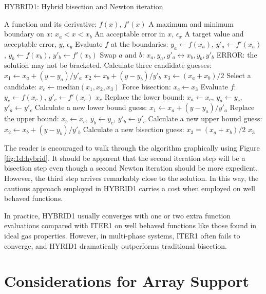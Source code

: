\documentclass{article}
\begin{document}
\begin{algorithm}
\caption{HYBRID1: Hybrid bisection and Newton iteration}\label{alg:hybrid1}
\begin{algorithmic}
\REQUIRE A function and its derivative: $f(x)$, $f'(x)$
\REQUIRE A maximum and minimum boundary on $x$: $x_a < x <x_b$
\REQUIRE An acceptable error in $x$, $\epsilon_x$
\REQUIRE A target value and acceptable error, $y$, $\epsilon_y$
\STATE Evaluate $f$ at the boundaries: 
\STATE $y_a \leftarrow f(x_a)$, $y'_a \leftarrow f'(x_a)$, $y_b \leftarrow f(x_b)$, $y'_b \leftarrow f'(x_b)$
\STATE Swap $a$ and $b$: 
\STATE $x_a,y_a,y'_a \leftrightarrow x_b,y_b,y'_b$
\ENDIF
{}
\RETURN ERROR: the solution may not be bracketed.
\ENDIF
\STATE Calculate three candidate guesses:
\STATE $x_1 \leftarrow x_a + (y-y_a)/y'_a$
\STATE $x_2 \leftarrow x_b + (y-y_b)/y'_b$
\STATE $x_3 \leftarrow (x_a + x_b)/2$
\STATE Select a candidate: 
\STATE $x_c \leftarrow \mathrm{median}(x_1,x_2,x_3)$
\STATE Force bisection: 
\STATE $x_c \leftarrow x_3$
\ENDIF
\STATE Evaluate $f$: 
\STATE $y_c \leftarrow f(x_c)$, $y'_c\leftarrow f'(x_c)$
\RETURN $x_c$
\ENDIF
{}
\STATE Replace the lower bound: 
\STATE $x_a \leftarrow x_c$, $y_a \leftarrow y_c$, $y'_a \leftarrow y'_c$
\STATE Calculate a new lower bound guess:
\STATE $x_1 \leftarrow x_a + (y - y_a)/y'_a$
\ELSE
\STATE Replace the upper bound:
\STATE $x_b \leftarrow x_c$, $y_b \leftarrow y_c$, $y'_b \leftarrow y'_c$
\STATE Calculate a new upper bound guess:
\STATE $x_2 \leftarrow x_b + (y - y_b)/y'_b$
\ENDIF
\STATE Calculate a new bisection guess:
\STATE $x_3 = (x_a + x_b)/2$
\RETURN $x_3$
\ENDWHILE

\end{algorithmic}
\end{algorithm}

The reader is encouraged to walk through the algorithm graphically using Figure \ref{fig:1d:hybrid}.  It should be apparent that the second iteration step will be a bisection step even though a second Newton iteration should be more expedient.  However, the third step arrives remarkably close to the solution.  In this way, the cautious approach employed in HYBRID1 carries a cost when employed on well behaved functions.

In practice, HYBRID1 usually converges with one or two extra function evaluations compared with ITER1 on well behaved functions like those found in ideal gas properties.  However, in multi-phase systems, ITER1 often fails to converge, and HYRID1 dramatically outperforms traditional bisection.  


\section{Considerations for Array Support}
\end{document}

